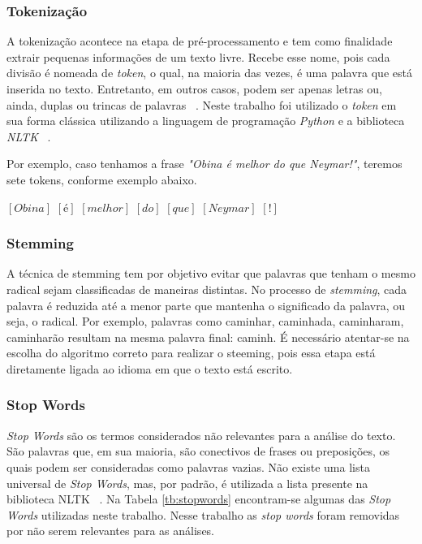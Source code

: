         \subsubsection{Tokenização}

              A tokenização acontece na etapa de pré-processamento e tem como finalidade extrair pequenas informações de um texto livre. Recebe esse nome, pois cada divisão é nomeada de \textit{token}, 
              o qual, na maioria das vezes, é uma palavra que está inserida no texto. Entretanto, em outros casos, podem ser apenas letras ou, ainda, duplas ou trincas de palavras ~\cite{mcnamee2004character}. Neste trabalho foi utilizado o \textit{token} em sua forma clássica utilizando 
            a linguagem de programação \textit{Python} e a biblioteca \textit{NLTK} ~\cite{bird2004nltk}.

              Por exemplo, caso tenhamos a frase \textit{"Obina é melhor do que Neymar!"}, teremos sete tokens, conforme exemplo abaixo.

                    $[Obina]$  $[é]$  $[melhor]$  $[do]$  $[que]$  $[Neymar]$  $[!]$
        \subsubsection{Stemming}

          A técnica de stemming tem por objetivo evitar que palavras que tenham o mesmo radical sejam classificadas de maneiras distintas. No processo de \textit{stemming}, 
          cada palavra é reduzida até a menor parte que mantenha o significado da palavra, ou seja, o radical. Por exemplo, palavras como caminhar, caminhada, caminharam, 
          caminharão resultam na mesma palavra final: caminh.
          É necessário atentar-se na escolha do algoritmo correto para realizar o steeming, pois essa etapa está diretamente ligada ao idioma em que o texto está escrito.
        \subsubsection{Stop Words}

            \textit{Stop Words} são os termos considerados não relevantes para a análise do texto. São palavras que, em sua maioria, são conectivos de frases ou preposições, 
            os quais podem ser consideradas como palavras vazias. Não existe uma lista universal de \textit{Stop Words}, mas, por padrão, é 
            utilizada a lista presente na biblioteca NLTK ~\cite{bird2004nltk}. Na Tabela \ref{tb:stopwords} encontram-se algumas das \textit{Stop Words} utilizadas neste trabalho.
            Nesse trabalho as \textit{stop words} foram removidas por não serem relevantes para as análises.

